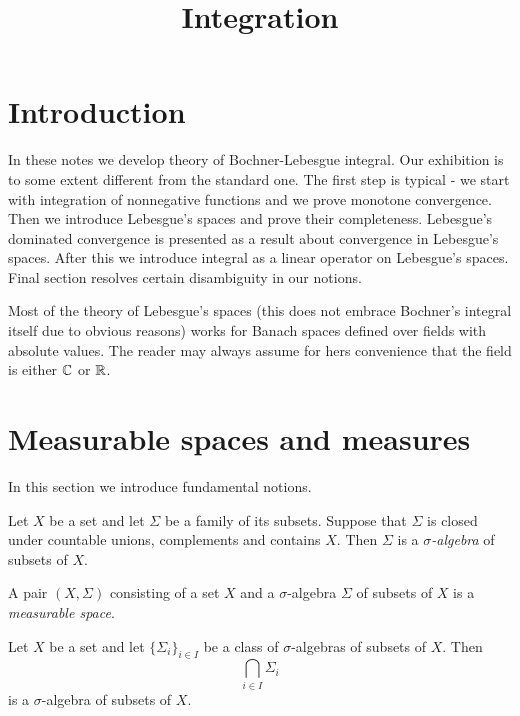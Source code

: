 \documentclass[10pt]{amsart}
\begin{document}
\title{Integration}
\date{}
\maketitle

\section{Introduction}
In these notes we develop theory of Bochner-Lebesgue integral. Our exhibition is to some extent different from the standard one. The first step is typical - we start with integration of nonnegative functions and we prove monotone convergence. Then we introduce Lebesgue's spaces and prove their completeness. Lebesgue's dominated convergence is presented as a result about convergence in Lebesgue's spaces. After this we introduce integral as a linear operator on Lebesgue's spaces. Final section resolves certain disambiguity in our notions.

Most of the theory of Lebesgue's spaces (this does not embrace Bochner's integral itself due to obvious reasons) works for Banach spaces defined over fields with absolute values. The reader may always assume for hers convenience that the field is either ${\mathbb C}$ or ${\mathbb R}$.


\section{Measurable spaces and measures}
\noindent
In this section we introduce fundamental notions.

\begin{definition}
	Let $X$ be a set and let $\Sigma$ be a family of its subsets. Suppose that $\Sigma$ is closed under countable unions, complements and contains $X$. Then $\Sigma$ is a \textit{$\sigma$-algebra} of subsets of $X$.
\end{definition}

\begin{definition}
	A pair $(X,\Sigma)$ consisting of a set $X$ and a $\sigma$-algebra $\Sigma$ of subsets of $X$ is a \textit{measurable space}.
\end{definition}

\begin{remark}\label{remark:sigma_algebras_are_closed_under_arbitrary_intersections}
	Let $X$ be a set and let $\{\Sigma_i\}_{i\in I}$ be a class of $\sigma$-algebras of subsets of $X$. Then
	$$\bigcap_{i\in I}\Sigma_i$$
	is a $\sigma$-algebra of subsets of $X$.
\end{remark}
\end{document}
